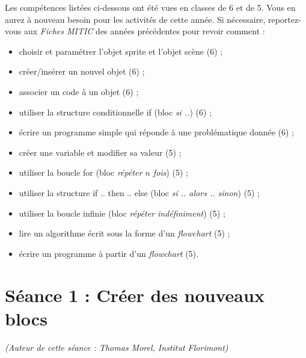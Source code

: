 Les compétences listées ci-dessous ont été vues en classes de 6 et de 5. Vous en aurez à nouveau besoin pour les activités de cette année. Si nécessaire, reportez-vous aux \emph{Fiches MITIC} des années précédentes pour revoir comment :  

\begin{itemize}
\item choisir et paramétrer l'objet sprite et l'objet scène (6) ;
\item créer/insérer un nouvel objet (6) ; 
\item associer un code à un objet (6) ;
\item utiliser la structure conditionnelle if (bloc \emph{si ..}) (6) ; 
\item écrire un programme simple qui réponde à une problématique donnée (6) ;
\item créer une variable et modifier sa valeur (5) ;
\item utiliser la boucle for (bloc \emph{répéter $n$ fois}) (5) ;
\item utiliser la structure if .. then .. else (bloc \emph{si .. alors .. sinon}) (5) ; 
\item utiliser la boucle infinie (bloc \emph{répéter indéfiniment}) (5) ;
\item lire un algorithme écrit sous la forme d'un \emph{flowchart} (5) ;
\item écrire un programme à partir d'un \emph{flowchart} (5).
\end{itemize}













%
%
%
%



\section{Séance 1 : Créer des nouveaux blocs}\label{ficheScratch4e1}

{\footnotesize \emph{(Auteur de cette séance : Thomas Morel, Institut Florimont)}}

\vspace{6pt}

